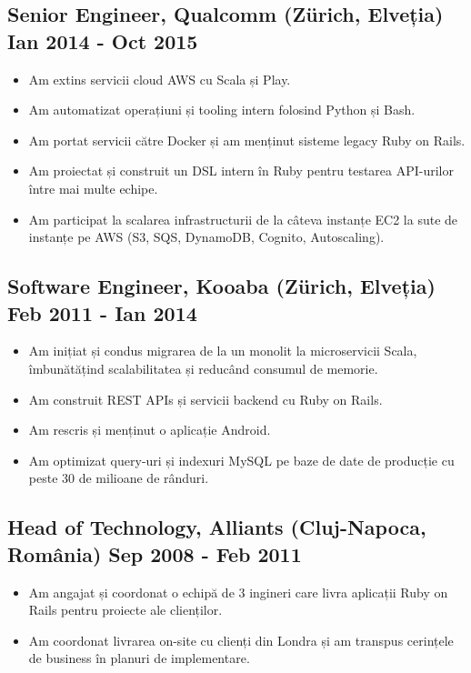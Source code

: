 \documentclass[11pt,a4paper]{article}
\begin{document}
\subsection*{Senior Engineer, Qualcomm (Zürich, Elveția) \hfill Ian 2014 - Oct 2015}
\begin{itemize}
  \item Am extins servicii cloud AWS cu Scala și Play.
  \item Am automatizat operațiuni și tooling intern folosind Python și Bash.
  \item Am portat servicii către Docker și am menținut sisteme legacy Ruby on Rails.
  \item Am proiectat și construit un DSL intern în Ruby pentru testarea API-urilor între mai multe echipe.
  \item Am participat la scalarea infrastructurii de la câteva instanțe EC2 la sute de instanțe pe AWS (S3, SQS, DynamoDB, Cognito, Autoscaling).
\end{itemize}

\subsection*{Software Engineer, Kooaba (Zürich, Elveția) \hfill Feb 2011 - Ian 2014}
\begin{itemize}
  \item Am inițiat și condus migrarea de la un monolit la microservicii Scala, îmbunătățind scalabilitatea și reducând consumul de memorie.
  \item Am construit REST APIs și servicii backend cu Ruby on Rails.
  \item Am rescris și menținut o aplicație Android.
  \item Am optimizat query-uri și indexuri MySQL pe baze de date de producție cu peste 30 de milioane de rânduri.
\end{itemize}

\subsection*{Head of Technology, Alliants (Cluj-Napoca, România) \hfill Sep 2008 - Feb 2011}
\begin{itemize}
  \item Am angajat și coordonat o echipă de 3 ingineri care livra aplicații Ruby on Rails pentru proiecte ale clienților.
  \item Am coordonat livrarea on-site cu clienți din Londra și am transpus cerințele de business în planuri de implementare.
\end{itemize}
\end{document}
